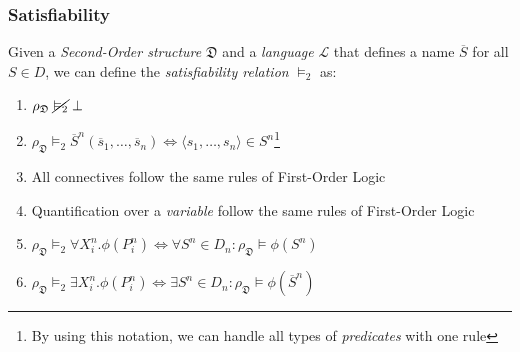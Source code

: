 \documentclass{beamer}
\begin{document}
                \begin{frame}
                    \frametitle{Satisfiability}
                    \begin{definition}
                        Given a \textit{Second-Order structure} $ \mathfrak{D} $ and a \textit{language} $ \mathcal{L} $ that defines a name $ \overline{S} $ for all $ S \in D $, we can define the \textit{satisfiability relation} $ \vDash_2 $ as:
                        \begin{enumerate}
                            \item $ \rho_\mathfrak{D}\; \cancel{\vDash_2}\; \bot $
                            \item $ \rho_\mathfrak{D} \vDash_2 \overline{S}^n(\overline{s}_1, \dots, \overline{s}_n) \Leftrightarrow \langle s_1, \dots, s_n \rangle \in S^n $\footnote{By using this notation, we can handle all types of \textit{predicates} with one rule}
                            \item All connectives follow the same rules of First-Order Logic
                            \item Quantification over a \textit{variable} follow the same rules of First-Order Logic
                            \item $ \rho_\mathfrak{D} \vDash_2 \forall X^n_i. \phi(P^n_i) \Leftrightarrow \forall S^n \in D_n: \rho_\mathfrak{D} \vDash \phi(S^n) $
                            \item $ \rho_\mathfrak{D} \vDash_2 \exists X^n_i. \phi(P^n_i) \Leftrightarrow \exists S^n \in D_n: \rho_\mathfrak{D} \vDash \phi(\overline{S}^n) $
                        \end{enumerate}
                    \end{definition}
                \end{frame}
                
\end{document}
